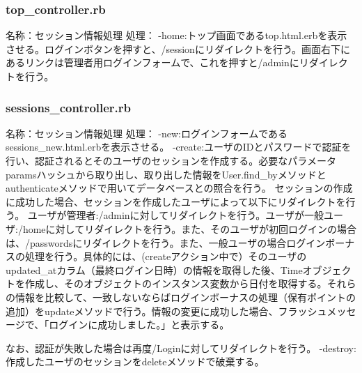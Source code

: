 \documentclass[a4j]{jarticle}
\begin{document}
\subsubsection{top\_controller.rb}
\noindent 名称：セッション情報処理	\newline
処理： \newline
-home:トップ画面であるtop.html.erbを表示させる。ログインボタンを押すと、/sessionにリダイレクトを行う。画面右下にあるリンクは管理者用ログインフォームで、これを押すと/adminにリダイレクトを行う。\newline







\subsubsection{sessions\_controller.rb}
\noindent 名称：セッション情報処理	\newline
処理： \newline
-new:ログインフォームであるsessions\_new.html.erbを表示させる。\newline
-create:ユーザのIDとパスワードで認証を行い、認証されるとそのユーザのセッションを作成する。必要なパラメータparamsハッシュから取り出し、取り出した情報をUser.find\_byメソッドとauthenticateメソッドで用いてデータベースとの照合を行う。
セッションの作成に成功した場合、セッションを作成したユーザによって以下にリダイレクトを行う。\newline
ユーザが管理者:/adminに対してリダイレクトを行う。ユーザが一般ユーザ:/homeに対してリダイレクトを行う。また、そのユーザが初回ログインの場合は、/passwordsにリダイレクトを行う。また、一般ユーザの場合ログインボーナスの処理を行う。具体的には、(createアクション中で）そのユーザのupdated\_atカラム（最終ログイン日時）の情報を取得した後、Timeオブジェクトを作成し、そのオブジェクトのインスタンス変数から日付を取得する。それらの情報を比較して、一致しないならばログインボーナスの処理（保有ポイントの追加）をupdateメソッドで行う。情報の変更に成功した場合、フラッシュメッセージで、「ログインに成功しました。」と表示する。


なお、認証が失敗した場合は再度/Loginに対してリダイレクトを行う。\newline
-destroy:作成したユーザのセッションをdeleteメソッドで破棄する。
\end{document}
